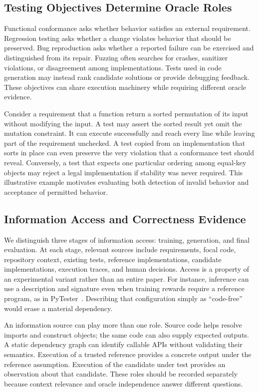 \subsection{Testing Objectives Determine Oracle Roles}
Functional conformance asks whether behavior satisfies an external requirement. Regression testing asks whether a change violates behavior that should be preserved. Bug reproduction asks whether a reported failure can be exercised and distinguished from its repair. Fuzzing often searches for crashes, sanitizer violations, or disagreement among implementations. Tests used in code generation may instead rank candidate solutions or provide debugging feedback. These objectives can share execution machinery while requiring different oracle evidence.

Consider a requirement that a function return a sorted permutation of its input without modifying the input. A test may assert the sorted result yet omit the mutation constraint. It can execute successfully and reach every line while leaving part of the requirement unchecked. A test copied from an implementation that sorts in place can even preserve the very violation that a conformance test should reveal. Conversely, a test that expects one particular ordering among equal-key objects may reject a legal implementation if stability was never required. This illustrative example motivates evaluating both detection of invalid behavior and acceptance of permitted behavior.

\subsection{Information Access and Correctness Evidence}
We distinguish three stages of information access: training, generation, and final evaluation. At each stage, relevant sources include requirements, focal code, repository context, existing tests, reference implementations, candidate implementations, execution traces, and human decisions. Access is a property of an experimental variant rather than an entire paper. For instance, inference can use a description and signature even when training rewards require a reference program, as in PyTester~\cite{T01}. Describing that configuration simply as ``code-free'' would erase a material dependency.

An information source can play more than one role. Source code helps resolve imports and construct objects; the same code can also supply expected outputs. A static dependency graph can identify callable APIs without validating their semantics. Execution of a trusted reference provides a concrete output under the reference assumption. Execution of the candidate under test provides an observation about that candidate. These roles should be recorded separately because context relevance and oracle independence answer different questions.



